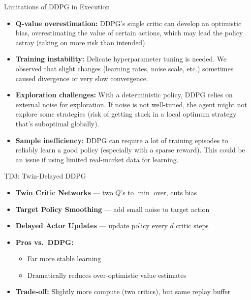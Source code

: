 \documentclass[11pt,aspectratio=169]{beamer}   %
\begin{document}
\begin{frame}{Limitations of DDPG in Execution}
	\begin{itemize}
		\item \textbf{Q-value overestimation:} DDPG’s single critic can develop an optimistic bias, overestimating the value of certain actions, which may lead the policy astray (taking on more risk than intended).
		\item \textbf{Training instability:} Delicate hyperparameter tuning is needed. We observed that slight changes (learning rates, noise scale, etc.) sometimes caused divergence or very slow convergence.
		\item \textbf{Exploration challenges:} With a deterministic policy, DDPG relies on external noise for exploration. If noise is not well-tuned, the agent might not explore some strategies (risk of getting stuck in a local optimum strategy that’s suboptimal globally).
		\item \textbf{Sample inefficiency:} DDPG can require a lot of training episodes to reliably learn a good policy (especially with a sparse reward). This could be an issue if using limited real-market data for learning.
	\end{itemize}
\end{frame}

\begin{frame}{TD3: Twin-Delayed DDPG}
	\begin{itemize}
		\item \textbf{Twin Critic Networks} — two $Q$’s to {\small$\min$} over, cuts bias  
		\item \textbf{Target Policy Smoothing} — add small noise to target action  
		\item \textbf{Delayed Actor Updates} — update policy every $d$ critic steps  
		\item \textbf{Pros vs.\ DDPG:}
		\begin{itemize}
			\item Far more stable learning  
			\item Dramatically reduces over-optimistic value estimates  
		\end{itemize}
		\item \textbf{Trade-off:} Slightly more compute (two critics), but same replay buffer  
	\end{itemize}
\end{frame}
\end{document}
